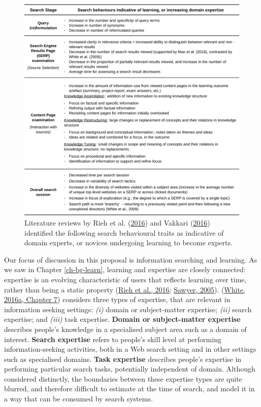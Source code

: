 \documentclass[letterpaper, nobind]{templates/ociamthesis}
\begin{document}
\begin{figure}

{\centering \includegraphics[width=1\linewidth]{figs/search-behaviours} 

}

\caption[Components of metacognition.]{Literature reviews by Rieh et al. (\protect\hyperlink{ref-rieh2016searching}{2016}) and Vakkari (\protect\hyperlink{ref-vakkari2016searching}{2016}) identified the following search behavioural traits as indicative of domain experts, or novices undergoing learning to become experts.}\label{fig:search-behaviours}
\end{figure}





Our focus of discussion in this proposal is information searching and
learning. As we saw in Chapter \ref{ch-bg-learn}, learning and expertise are closely connected:
expertise is an evolving characteristic of users that reflects learning
over time, rather than being a static property
(\protect\hyperlink{ref-rieh2016searching}{Rieh et al., 2016}; \protect\hyperlink{ref-sawyer2005cambridge}{Sawyer, 2005}). (\protect\hyperlink{ref-white2016interactions}{White, 2016a, Chapter 7}) considers three types of expertise, that are relevant in
information seeking settings: \emph{(i)} domain or subject-matter expertise;
\emph{(ii)} search expertise; and \emph{(iii)} task expertise. \textbf{Domain or
subject-matter expertise} describes people's knowledge in a specialised
subject area such as a domain of interest. \textbf{Search expertise} refers
to people's skill level at performing information-seeking activities,
both in a Web search setting and in other settings such as specialised
domains. \textbf{Task expertise} describes people's expertise in performing
particular search tasks, potentially independent of domain. Although
considered distinctly, the boundaries between these expertise types are
quite blurred, and therefore difficult to estimate at the time of
search, and model it in a way that can be consumed by search systems.
\end{document}
